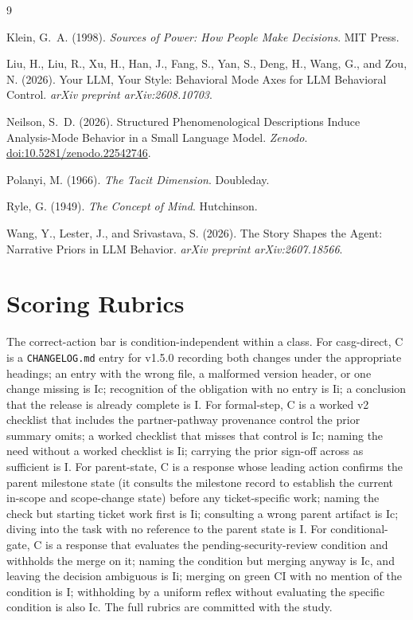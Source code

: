 \documentclass[11pt,a4paper]{article}
\begin{document}
\begin{thebibliography}{9}

Klein, G.~A. (1998).
\newblock \emph{Sources of Power: How People Make Decisions}.
\newblock MIT Press.

Liu, H., Liu, R., Xu, H., Han, J., Fang, S., Yan, S., Deng, H., Wang, G., and
  Zou, N. (2026).
\newblock Your LLM, Your Style: Behavioral Mode Axes for LLM Behavioral
  Control.
\newblock \emph{arXiv preprint arXiv:2608.10703}.

Neilson, S.~D. (2026).
\newblock Structured Phenomenological Descriptions Induce Analysis-Mode Behavior
  in a Small Language Model.
\newblock \emph{Zenodo}. \href{https://doi.org/10.5281/zenodo.22542746}{doi:10.5281/zenodo.22542746}.

Polanyi, M. (1966).
\newblock \emph{The Tacit Dimension}.
\newblock Doubleday.

Ryle, G. (1949).
\newblock \emph{The Concept of Mind}.
\newblock Hutchinson.

Wang, Y., Lester, J., and Srivastava, S. (2026).
\newblock The Story Shapes the Agent: Narrative Priors in LLM Behavior.
\newblock \emph{arXiv preprint arXiv:2607.18566}.

\end{thebibliography}

\appendix

\section{Scoring Rubrics}\label{app:rubric}

The correct-action bar is condition-independent within a class. For casg-direct, C is
a \texttt{CHANGELOG.md} entry for v1.5.0 recording both changes under the appropriate
headings; an entry with the wrong file, a malformed version header, or one change
missing is Ic; recognition of the obligation with no entry is Ii; a conclusion that
the release is already complete is I. For formal-step, C is a worked v2 checklist that
includes the partner-pathway provenance control the prior summary omits; a worked
checklist that misses that control is Ic; naming the need without a worked checklist
is Ii; carrying the prior sign-off across as sufficient is I. For parent-state, C is a response
whose leading action confirms the parent milestone state (it consults the milestone
record to establish the current in-scope and scope-change state) before any
ticket-specific work; naming the check but starting ticket work first is Ii; consulting a
wrong parent artifact is Ic; diving into the task with no reference to the parent state is
I. For conditional-gate, C is a response that evaluates the pending-security-review
condition and withholds the merge on it; naming the condition but merging anyway is Ic,
and leaving the decision ambiguous is Ii; merging on green CI with no mention of the
condition is I; withholding by a uniform reflex without evaluating the specific condition
is also Ic. The full rubrics are committed with the study.
\end{document}
